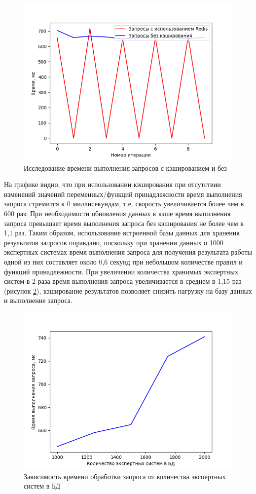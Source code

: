 \begin{figure}[H]
	\centering
	\includegraphics[width=0.7\linewidth]{img/redis}
	\caption{Исследование времени выполнения запросов с кэшированием и без}
	\label{fig:redis}
\end{figure}

На графике видно, что при использовании кэширования при отсутствии изменений значений переменных/функций принадлежности время выполнения запроса стремится к 0 миллисекундам, т.е. скорость увеличивается более чем в 600 раз. При необходимости обновления данных в кэше время выполнения запроса превышает время выполнения запроса без кэширования не более чем в 1,1 раз. Таким образом, использование встроенной базы данных для хранения результатов запросов оправдано, поскольку при хранении данных о 1000 экспертных системах время выполнения запроса для получения результата работы одной из них составляет около 0,6 секунд при небольшом количестве правил и функций принадлежности. При увеличении количества хранимых экспертных систем в 2 раза время выполнения запроса увеличивается в среднем в 1,15 раз (рисунок \ref{fig:timefromn}), кэширование результатов позволяет снизить нагрузку на базу данных и выполнение запроса.

\begin{figure}[H]
	\centering
	\includegraphics[width=0.7\linewidth]{img/time_from_n}
	\caption{Зависимость времени обработки запроса от количества экспертных систем в БД}
	\label{fig:timefromn}
\end{figure}

